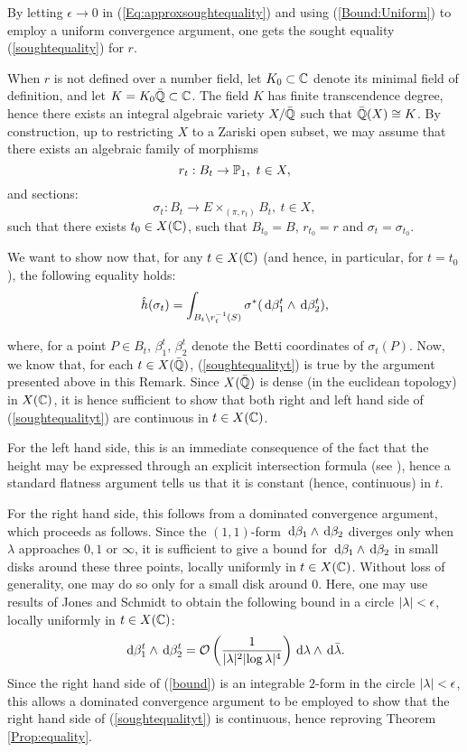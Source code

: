 \documentclass[a4paper,12pt]{article}
\theoremstyle{remark}
\newcommand{\bigO}{\bigo}
\begin{document}
\begin{remark}
	By letting $\epsilon \to 0$ in (\ref{Eq:approxsoughtequality}) and using (\ref{Bound:Uniform}) to employ a uniform convergence argument, one gets the sought equality (\ref{soughtequality}) for $r$.
	
	When $r$ is not defined over a number field, let $K_0 \subset \C$ denote its minimal field of definition, and let $K=K_0\bar{\Q} \subset \C$. The field $K$ has finite transcendence degree, hence there exists an integral algebraic variety $X/\bar{\Q}$ such that $\bar{\Q}(X)\cong K$. By construction, up to restricting $X$ to a Zariski open subset, we may assume that there exists an algebraic family of morphisms
	\[
	r_t:B_t \rightarrow \P_1, \ t \in X,
	\]
	and sections:
	\[
	\sigma_t:B_t \rightarrow E\times_{(\pi,r_t)}B_t, \ t \in X,
	\]
	such that there exists $t_0 \in X(\C)$, such that $B_{t_0}=B$, $r_{t_0}=r$ and $\sigma_t=\sigma_{t_0}$. 
	
	We want to show now that, for any $t \in X(\C)$ (and hence, in particular, for $t=t_0$), the following equality holds:
	\begin{equation}\label{soughtequalityt}
		\hat{h}(\sigma_t) = \int_{B_t \setminus r_t^{-1}(S)} \sigma^*(\de \beta_1^t \wedge \de \beta_2^t),
	\end{equation}
	
	where, for a point $P \in B_t$, $\beta_1^t$, $\beta_2^t$ denote the Betti coordinates of $\sigma_t(P)$.
	Now, we know that, for each $t \in X(\bar{\Q})$, (\ref{soughtequalityt}) is true by the argument presented above in this Remark. Since $X(\bar{\Q})$ is dense (in the euclidean topology) in $X(\C)$, it is hence sufficient to show that both right and left hand side of (\ref{soughtequalityt}) are continuous in $t \in X(\C)$. 
	
	For the left hand side, this is an immediate consequence of the fact that the height may be expressed through an explicit intersection formula (see \cite[Section 11.8]{ellipticsurfaces}), hence a standard flatness argument tells us that it is constant (hence, continuous) in $t$.
	
	For the right hand side, this follows from a dominated convergence argument, which proceeds as follows. Since the $(1,1)$-form $\de \beta_1 \wedge \de \beta_2$ diverges only when $\lambda$ approaches $0,1$ or $\infty$, it is sufficient to give a bound for $\de \beta_1 \wedge \de \beta_2$ in small disks around these three points, locally uniformly in $t \in X(\C)$. Without loss of generality, one may do so only for a small disk around $0$. Here, one may use results of Jones and Schmidt \cite{garethschmidt} to obtain the following bound in a circle $\abs{\lambda} < \epsilon$, locally uniformly in $t \in X(\C)$:
	\begin{equation}\label{bound}
	\de \beta_1^t \wedge \de \beta_2^t= \bigO\left(\frac{1}{\abs{\lambda}^2 \abs{\log \lambda}^4}\right)\de \lambda \wedge \de \bar{\lambda}. 
	\end{equation}
	Since the right hand side of (\ref{bound}) is an integrable $2$-form in the circle $\abs{\lambda}<\epsilon$, this allows a dominated convergence argument to be employed to show that the right hand side of (\ref{soughtequalityt}) is continuous, hence reproving Theorem \ref{Prop:equality}.
\end{remark}
\end{document}
